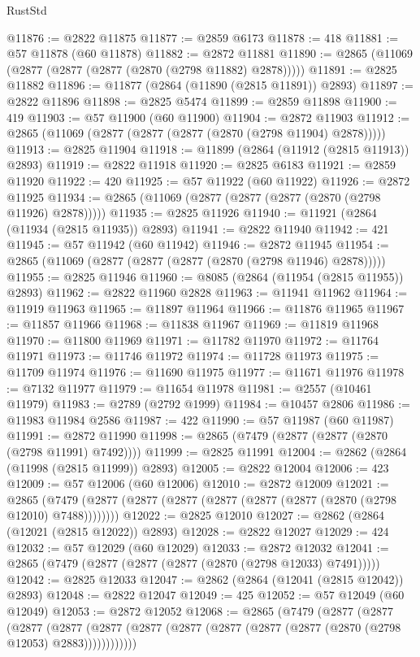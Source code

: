 \begin{lexlean}{RustStd}
\begin{coremodule}
@11876 := @2822 @11875
@11877 := @2859 @6173
@11878 := 418
@11881 := @57 @11878 (@60 @11878)
@11882 := @2872 @11881
@11890 := @2865 (@11069 (@2877 (@2877 (@2877 (@2870 (@2798 @11882) @2878)))))
@11891 := @2825 @11882
@11896 := @11877 (@2864 (@11890 (@2815 @11891)) @2893)
@11897 := @2822 @11896
@11898 := @2825 @5474
@11899 := @2859 @11898
@11900 := 419
@11903 := @57 @11900 (@60 @11900)
@11904 := @2872 @11903
@11912 := @2865 (@11069 (@2877 (@2877 (@2877 (@2870 (@2798 @11904) @2878)))))
@11913 := @2825 @11904
@11918 := @11899 (@2864 (@11912 (@2815 @11913)) @2893)
@11919 := @2822 @11918
@11920 := @2825 @6183
@11921 := @2859 @11920
@11922 := 420
@11925 := @57 @11922 (@60 @11922)
@11926 := @2872 @11925
@11934 := @2865 (@11069 (@2877 (@2877 (@2877 (@2870 (@2798 @11926) @2878)))))
@11935 := @2825 @11926
@11940 := @11921 (@2864 (@11934 (@2815 @11935)) @2893)
@11941 := @2822 @11940
@11942 := 421
@11945 := @57 @11942 (@60 @11942)
@11946 := @2872 @11945
@11954 := @2865 (@11069 (@2877 (@2877 (@2877 (@2870 (@2798 @11946) @2878)))))
@11955 := @2825 @11946
@11960 := @8085 (@2864 (@11954 (@2815 @11955)) @2893)
@11962 := @2822 @11960 @2828
@11963 := @11941 @11962
@11964 := @11919 @11963
@11965 := @11897 @11964
@11966 := @11876 @11965
@11967 := @11857 @11966
@11968 := @11838 @11967
@11969 := @11819 @11968
@11970 := @11800 @11969
@11971 := @11782 @11970
@11972 := @11764 @11971
@11973 := @11746 @11972
@11974 := @11728 @11973
@11975 := @11709 @11974
@11976 := @11690 @11975
@11977 := @11671 @11976
@11978 := @7132 @11977
@11979 := @11654 @11978
@11981 := @2557 (@10461 @11979)
@11983 := @2789 (@2792 @1999)
@11984 := @10457 @2806
@11986 := @11983 @11984 @2586
@11987 := 422
@11990 := @57 @11987 (@60 @11987)
@11991 := @2872 @11990
@11998 := @2865 (@7479 (@2877 (@2877 (@2870 (@2798 @11991) @7492))))
@11999 := @2825 @11991
@12004 := @2862 (@2864 (@11998 (@2815 @11999)) @2893)
@12005 := @2822 @12004
@12006 := 423
@12009 := @57 @12006 (@60 @12006)
@12010 := @2872 @12009
@12021 := @2865 (@7479 (@2877 (@2877 (@2877 (@2877 (@2877 (@2877 (@2870 (@2798 @12010) @7488))))))))
@12022 := @2825 @12010
@12027 := @2862 (@2864 (@12021 (@2815 @12022)) @2893)
@12028 := @2822 @12027
@12029 := 424
@12032 := @57 @12029 (@60 @12029)
@12033 := @2872 @12032
@12041 := @2865 (@7479 (@2877 (@2877 (@2877 (@2870 (@2798 @12033) @7491)))))
@12042 := @2825 @12033
@12047 := @2862 (@2864 (@12041 (@2815 @12042)) @2893)
@12048 := @2822 @12047
@12049 := 425
@12052 := @57 @12049 (@60 @12049)
@12053 := @2872 @12052
@12068 := @2865
    (@7479
      (@2877
        (@2877
          (@2877
            (@2877 (@2877 (@2877 (@2877 (@2877 (@2877 (@2877 (@2870 (@2798 @12053) @2883))))))))))))

\end{coremodule}
\end{lexlean}
